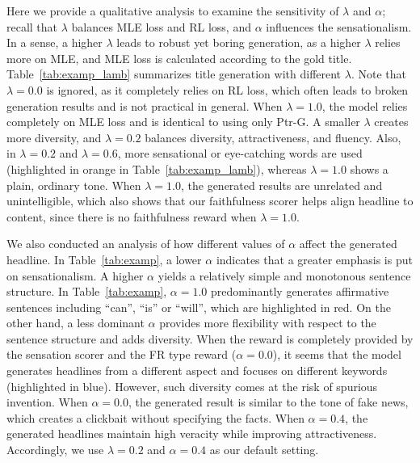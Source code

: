 Here we provide a qualitative analysis to examine the sensitivity of $\lambda$
and $\alpha$; recall that $\lambda$ balances MLE loss and RL loss, and $\alpha$
influences the sensationalism. In a sense, a higher $\lambda$ leads to robust yet
boring generation, as a higher $\lambda$ relies more on MLE, and MLE loss is
calculated according to the gold title. Table~\ref{tab:examp_lamb} summarizes
title generation with different $\lambda$.
Note that $\lambda=0.0$ is ignored, as it completely relies on RL loss, which
often leads to broken generation results and is not practical in general. When
$\lambda=1.0$, the model relies completely on MLE loss and is identical to
using only Ptr-G. A smaller $\lambda$ creates more diversity, and $\lambda=0.2$
balances diversity, attractiveness, and fluency. Also, in $\lambda=0.2$ and
$\lambda=0.6$, more sensational or eye-catching words are used (highlighted in
orange in Table~\ref{tab:examp_lamb}), whereas $\lambda=1.0$ shows a 
plain, ordinary tone. When $\lambda=1.0$, the generated results are unrelated
and unintelligible, which also shows that our faithfulness scorer helps align
headline to content, since there is no faithfulness reward when $\lambda=1.0$.

We also conducted an analysis of how different values of $\alpha$ affect the
generated headline. In Table~\ref{tab:examp}, a lower $\alpha$ indicates that a greater
emphasis is put on sensationalism.
A higher $\alpha$ yields a relatively simple and monotonous sentence structure.
In Table~\ref{tab:examp}, $\alpha=1.0$ predominantly generates affirmative
sentences including ``can'', ``is'' or ``will'', which are highlighted in red.
On the other hand, a less dominant $\alpha$ provides more flexibility with
respect to the sentence structure and adds diversity. 
When the reward is completely provided by the sensation scorer and the FR type
reward ($\alpha = 0.0$), it seems that the model generates headlines from a
different aspect and focuses on different keywords (highlighted in blue).
However, such diversity comes at the risk of spurious invention. When $\alpha =
0.0$, the generated result is similar to the tone of fake news, which creates a
clickbait without specifying the facts.
When $\alpha = 0.4$, the generated headlines maintain high veracity while
improving attractiveness. Accordingly, we use $\lambda=0.2$ and $\alpha=0.4$ as
our default setting.

